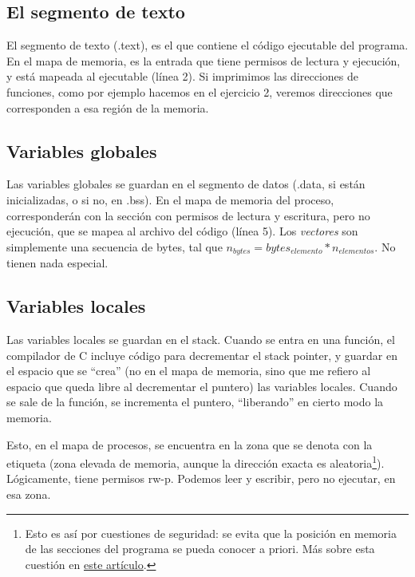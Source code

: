 \documentclass[a4paper]{article}
\begin{document}
\subsection{El segmento de texto}

El segmento de texto ({\ttfamily .text}), es el que contiene el código ejecutable del programa. En el mapa de memoria, es la entrada que tiene permisos de lectura y ejecución, y está mapeada al ejecutable (línea 2). Si imprimimos las direcciones de funciones, como por ejemplo hacemos en el ejercicio 2, veremos direcciones que corresponden a esa región de la memoria.

\subsection{Variables globales}

Las variables globales se guardan en el segmento de datos ({\ttfamily.data}, si están inicializadas, o si no, en {\ttfamily.bss}). En el mapa de memoria del proceso, corresponderán con la sección con permisos de lectura y escritura, pero no ejecución, que se mapea al archivo del código (línea 5). Los \emph{vectores} son simplemente una secuencia de bytes, tal que $n_{bytes}=bytes_{elemento}*n_{elementos}$. No tienen nada especial.

\subsection{Variables locales}

Las variables locales se guardan en el stack. Cuando se entra en una función, el compilador de C incluye código para decrementar el stack pointer, y guardar en el espacio que se ``crea'' (no en el mapa de memoria, sino que me refiero al espacio que queda libre al decrementar el puntero) las variables locales. Cuando se sale de la función, se incrementa el puntero, ``liberando'' en cierto modo la memoria.

Esto, en el mapa de procesos, se encuentra en la zona que se denota con la etiqueta {\ttfamily [stack]} (zona elevada de memoria, aunque la dirección exacta es aleatoria\footnote{Esto es así por cuestiones de seguridad: se evita que la posición en memoria de las secciones del programa se pueda conocer a priori. Más sobre esta cuestión en \href{https://manybutfinite.com/post/anatomy-of-a-program-in-memory/}{este artículo}.}). Lógicamente, tiene permisos {\ttfamily rw-p}. Podemos leer y escribir, pero no ejecutar, en esa zona.
\end{document}
